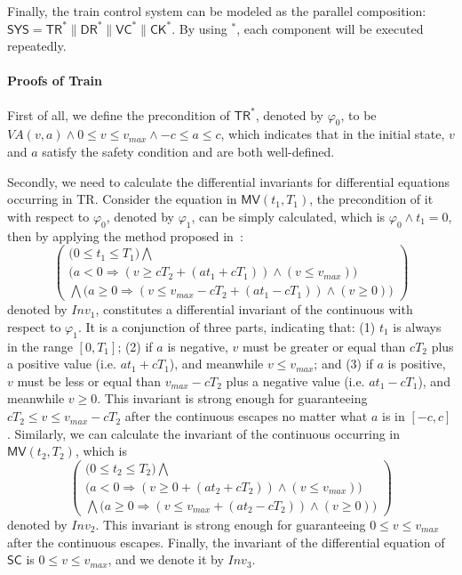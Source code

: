 \documentclass{llncs}
\newcommand{\Pre}{\varphi}
\begin{document}
Finally, the train control system can be modeled
as the  parallel composition:
$\textsf{SYS} = \textsf{TR}^* \| \textsf{DR}^* \| \textsf{VC}^* \| \textsf{CK}^*$.
By using $^*$,  each component will be executed repeatedly.

\paragraph{\textbf{Proofs of Train}}
\label{subsec:proof}
First of all,
we  define the precondition of $\textsf{TR} ^*$, denoted by $\Pre_0$, to be
$VA(v, a) \wedge 0 \leq v \leq v_{max} \wedge -c \leq a \leq c$, which indicates that
in the initial state, $v$ and $a$ satisfy the safety condition and are both well-defined.

Secondly, we need to calculate the differential invariants for differential equations occurring in \textsf{TR}.
Consider the equation in $\textsf{MV}(t_1, T_1)$,
the precondition of it with respect to $\Pre_0$, denoted by $\Pre_1$, can be simply calculated, which is $\Pre_0 \wedge t_1=0$, then
by applying the method proposed in~\cite{LZZ11}:
\[\left(
\begin{array}{l}
  \big(0 \leq t_1 \leq T_1\big) \bigwedge \\
   \big(a < 0  \Rightarrow (v \geq cT_2 + (at_1 + cT_1)) \wedge
    (v \leq v_{max}) \big)\\
   \bigwedge \big(a \geq 0  \Rightarrow (v \leq v_{max} -cT_2 + (at_1 - cT_1)) 
  \wedge (v \geq 0) \big)
\end{array}\right)\]
denoted by $Inv_1$, constitutes a differential invariant of the continuous with respect to $\Pre_1$.
It is a conjunction of three parts, indicating that:
(1) $t_1$ is always in the range $[0, T_1]$;  (2) if $a$ is negative, $v$
must be greater or equal than $cT_2$ plus  a positive value (i.e. $at_1 + cT_1$), and meanwhile $v \leq v_{max}$;
and (3) if $a$ is positive,
$v$  must be less or equal than $v_{max} -cT_2$ plus a negative value (i.e. $at_1 - cT_1$), and meanwhile $v \geq 0$.
This invariant is strong enough for guaranteeing  $cT_2 \leq v \leq v_{max}-cT_2$ after the continuous escapes no matter what $a$
is in $[-c, c]$.
Similarly, we can calculate the invariant of the continuous occurring in $\textsf{MV}(t_2, T_2)$, which is
\[\left(
\begin{array}{l}
  \big(0 \leq t_2 \leq T_2\big) \bigwedge \\
   \big(a < 0  \Rightarrow (v \geq 0 + (at_2 + cT_2)) \wedge
    (v \leq v_{max}) \big)\\
   \bigwedge \big(a \geq 0  \Rightarrow (v \leq v_{max} + (at_2 - cT_2))
  \wedge (v \geq 0) \big)
\end{array}\right)\]
denoted by $Inv_2$. This invariant is strong enough for guaranteeing $0 \leq v \leq v_{max}$ after the continuous escapes.
Finally, the invariant of the differential equation of $\textsf{SC}$ is $0 \leq v \leq v_{max}$, and we denote it by $Inv_3$.
\end{document}

